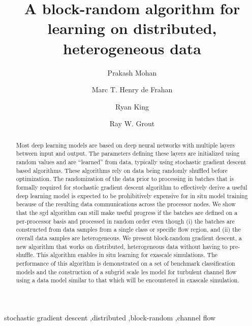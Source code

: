 \documentclass[review]{elsarticle}
\begin{document}
\begin{frontmatter}
\title{A block-random algorithm for learning on distributed, heterogeneous data}
\author[ut]{Prakash Mohan}
\author[nrel_hpacf]{Marc T. Henry de Frahan}
\author[nrel_cssog]{Ryan King}
\author[nrel_hpacf]{Ray W. Grout}
\address[ut]{Institute for Computational Engineering and Sciences, The University of Texas at Austin, 201 E. 24th Street, POB 4.102, Austin, Texas 78712, USA}
\address[nrel_hpacf]{High Performance Algorithms and Complex Fluids, Computational Science Center, National Renewable Energy Laboratory, 15013 Denver W Pkwy, ESIF301, Golden, CO 80401, USA}
\address[nrel_cssog]{Complex Systems Simulation and Optimization Group, Computational Science Center, National Renewable Energy Laboratory, 15013 Denver W Pkwy, ESIF301, Golden, CO 80401, USA}


\begin{abstract}

  Most deep learning models are based on deep neural networks with
  multiple layers between input and output. The parameters defining
  these layers are initialized using random values and are ``learned''
  from data, typically using stochastic gradient descent based
  algorithms. These algorithms rely on data being randomly shuffled
  before optimization. The randomization of the data prior to
  processing in batches that is formally required for stochastic
  gradient descent algorithm to effectively derive a useful deep
  learning model is expected to be prohibitively expensive for in situ
  model training because of the resulting data communications across
  the processor nodes. We show that the \gls{sgd} algorithm can still
  make useful progress if the batches are defined on a per-processor
  basis and processed in random order even though (i) the batches are
  constructed from data samples from a single class or specific flow
  region, and (ii) the overall data samples are heterogeneous. We
  present block-random gradient descent, a new algorithm that works on
  distributed, heterogeneous data without having to pre-shuffle. This
  algorithm enables in situ learning for exascale simulations. The
  performance of this algorithm is demonstrated on a set of benchmark
  classification models and the construction of a subgrid scale
  \gls{les} model for turbulent channel flow using a data model
  similar to that which will be encountered in exascale simulation.
  
\end{abstract}

\begin{keyword}
  stochastic gradient descent \sep distributed \sep block-random \sep channel flow 
\end{keyword}

\end{frontmatter}
\end{document}
